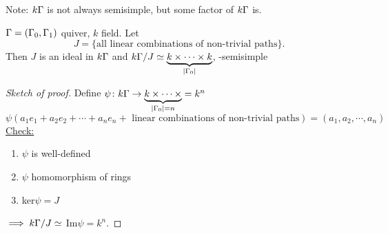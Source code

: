 Note: $k\Gamma$ is not always semisimple, but some factor of $k\Gamma$ is.

\begin{prop}
  $\Gamma=(\Gamma_0,\Gamma_1) $ quiver, $k$ field. Let
\[J = \{\text{all linear combinations of non-trivial paths}\}.\] 
Then $J$ is an ideal in $k\Gamma$ and
  $k\Gamma/J \simeq \underbrace{k \times \cdots \times k}_{|\Gamma_0|}$,
  -semisimple
\end{prop}
\begin{proof}[Sketch of proof]
  Define $\psi\colon k\Gamma \rightarrow \underbrace{k \times \cdots \times}_{|\Gamma_0|=n} = k^n $
\[\psi(a_1e_1 + a_2e_2 + \cdots + a_ne_n + \text{ linear combinations
    of non-trivial paths} ) = (a_1, a_2, \cdots, a_n)\]
  \underline{Check:} \begin{enumerate}
		\item  $\psi$ is well-defined
		\item $\psi$ homomorphism of rings
		\item ker$\psi=J$
	\end{enumerate}
	$\implies k\Gamma/J \simeq$ Im$\psi=k^n$.
\end{proof}
